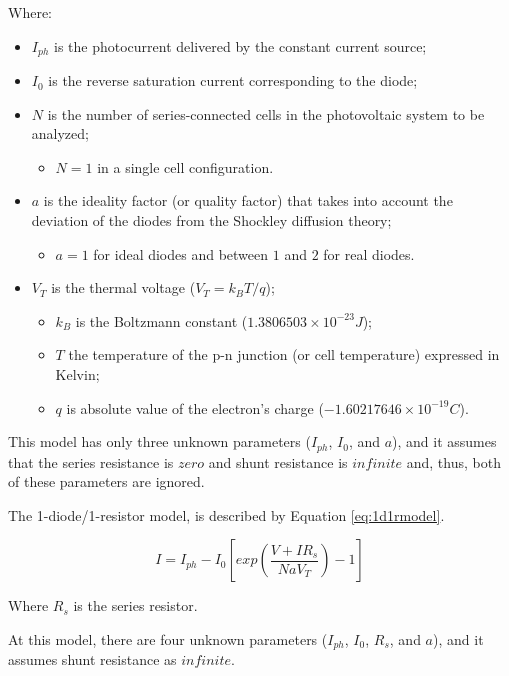 \documentclass[journal]{IEEEtran}
\begin{document}
Where:
\begin{itemize}
\item $I_{ph}$ is the photocurrent delivered by the constant current source; 
\item $ I_{0} $ is the reverse saturation current corresponding to the diode; 
\item $ N $ is the number of series-connected cells in the photovoltaic system to be analyzed;
	\begin{itemize}
	\item $ N=1 $ in a single cell configuration. 	
	\end{itemize}	  
\item $ a $ is the ideality factor (or quality factor) that takes into account the deviation of the diodes from the Shockley diffusion theory; 
	\begin{itemize}
	\item $a=1$ for ideal diodes and between $ 1 $ and $ 2 $ for real diodes. 	
	\end{itemize}
\item $V_{T}$ is the thermal voltage ($ V_{T}=k_{B}T/q $);
	\begin{itemize}
	\item $ k_{B} $ is the Boltzmann constant ($ 1.3806503\times10^{-23}J $); 
	\item $ T $ the temperature of the p-n junction (or cell temperature) expressed in Kelvin; 
	\item $ q $ is absolute value of the electron's charge ($ -1.60217646\times10^{-19}C $).	
	\end{itemize}	 
\end{itemize}


This model has only three unknown parameters ($ I_{ph}$, $I_{0}$, and $a $), and it assumes that the series resistance is $ zero $ and shunt resistance is $ infinite $ and, thus, both of these parameters are ignored.
 
The 1-diode/1-resistor model, is described by Equation \ref{eq:1d1rmodel}. 

\begin{equation}
\label{eq:1d1rmodel}
I =I_{ph}-I_{0}\left[ exp \left( \dfrac{V+IR_{s}}{NaV_{T}} \right) -1 \right] 
\end{equation}

Where $R_{s}$ is the series resistor.

At this model, there are four unknown parameters ($ I_{ph}$, $I_{0}$, $ R_{s} $, and $ a $), and it assumes shunt resistance as $ infinite $.
\end{document}
